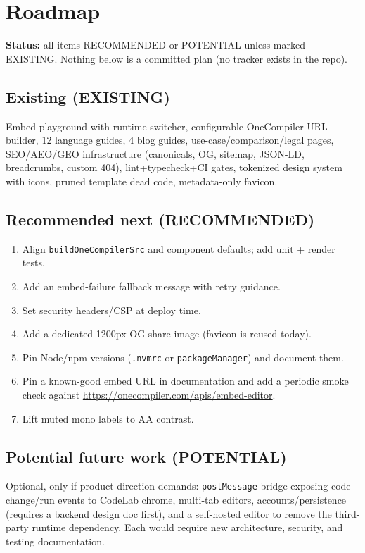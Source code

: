 \section{Roadmap}
\label{sec:roadmap}

\textbf{Status:} all items RECOMMENDED or POTENTIAL unless marked EXISTING. Nothing below is a committed plan (no tracker exists in the repo).

\subsection{Existing (EXISTING)}
Embed playground with runtime switcher, configurable OneCompiler URL builder, 12 language guides, 4 blog guides, use-case/comparison/legal pages, SEO/AEO/GEO infrastructure (canonicals, OG, sitemap, JSON-LD, breadcrumbs, custom 404), lint+typecheck+CI gates, tokenized design system with icons, pruned template dead code, metadata-only favicon.

\subsection{Recommended next (RECOMMENDED)}
\begin{enumerate}
\item Align \texttt{buildOneCompilerSrc} and component defaults; add unit + render tests.
\item Add an embed-failure fallback message with retry guidance.
\item Set security headers/CSP at deploy time.
\item Add a dedicated 1200px OG share image (favicon is reused today).
\item Pin Node/npm versions (\texttt{.nvmrc} or \texttt{packageManager}) and document them.
\item Pin a known-good embed URL in documentation and add a periodic smoke check against \url{https://onecompiler.com/apis/embed-editor}.
\item Lift muted mono labels to AA contrast.
\end{enumerate}

\subsection{Potential future work (POTENTIAL)}
Optional, only if product direction demands: \texttt{postMessage} bridge exposing code-change/run events to CodeLab chrome, multi-tab editors, accounts/persistence (requires a backend design doc first), and a self-hosted editor to remove the third-party runtime dependency. Each would require new architecture, security, and testing documentation.
